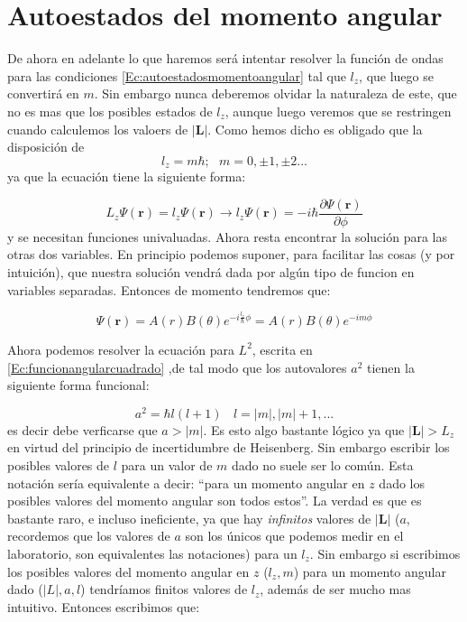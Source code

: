\documentclass[12pt]{article}
\newcommand{\parciales}[2]{\frac{\partial #1}{\partial #2}}
\newcommand{\rn}{\mathbf{r}}
\newcommand{\Ln}{\mathbf{L}}
\begin{document}
\section{Autoestados del momento angular}

De ahora en adelante lo que haremos será intentar resolver la función de ondas para las condiciones \ref{Ec:autoestadosmomentoangular} tal que $l_z$, que luego se convertirá en $m$. Sin embargo nunca deberemos olvidar la naturaleza de este, que no es mas que los posibles estados de $l_z$, aunque luego veremos que se restringen cuando calculemos los valoers de $|\Ln|$.  Como hemos dicho es obligado que la disposición de $$l_z = m \hbar; \ \ \ m = 0, \pm 1, \pm 2 ...$$ ya que la ecuación tiene la siguiente forma:


$$L_z \Psi (\rn) = l_z \Psi (\rn) \longrightarrow l_z \Psi (\rn) = - i \hbar \parciales{\Psi (\rn)}{\phi}  $$
y se necesitan funciones univaluadas. Ahora resta encontrar la solución para las otras dos variables. En principio podemos suponer, para facilitar las cosas (y por intuición), que nuestra solución vendrá dada por algún tipo de funcion en variables separadas. Entonces de momento tendremos que:

$$\Psi (\rn) = A(r) B(\theta) e^{-i \frac{l_z}{\hbar} \phi} = A(r) B (\theta) e^{-im \phi}$$

Ahora podemos resolver la ecuación para $L^2$, escrita en \ref{Ec:funcionangularcuadrado} ,de tal modo que los autovalores $a^2$ tienen la siguiente forma funcional:

\begin{equation}
a^2 = \hbar l(l+1) \ \ \ \ l = |m|, |m|+1,...
\end{equation}
es decir debe verficarse que $a>|m|$. Es esto algo bastante lógico ya que $|\Ln| > L_z$ en virtud del principio de incertidumbre de Heisenberg. Sin embargo escribir los posibles valores de $l$ para un valor de $m$ dado no suele ser lo común. Esta notación sería equivalente a decir: ``para un momento angular en $z$ dado los posibles valores del momento angular son todos estos''. La verdad es que es bastante raro, e incluso ineficiente, ya que hay \textit{infinitos} valores de $|\Ln|$ ($a$, recordemos que los valores de $a$ son los únicos que podemos medir en el laboratorio, son equivalentes las notaciones) para un $l_z$. Sin embargo si escribimos los posibles valores del momento angular en $z$ ($l_z, m$) para un momento angular dado ($|L|,a,l$) tendríamos finitos valores de $l_z$, además de ser mucho mas intuitivo. Entonces escribimos que:
\end{document}
